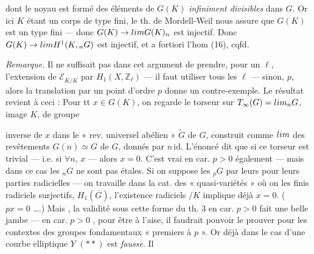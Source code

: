 \documentclass[11pt,a4paper]{article}
\begin{document}
dont le noyau  est formé des éléments de $G(K)$ \emph{infiniment divisibles} dans $G$. Or ici $K$ étant un  corps  de type fini, le th. de Mordell-Weil nous assure que $G(K)$ est un   type fini — donc $G(K) \to \varprojlim G(K)_n$ est injectif. Donc $G(K) \to \varprojlim H^1(K, {}_nG)$ est injectif, et a fortiori l'hom (16), cqfd.

\emph{Remarque.} Il ne suffisait pas dans cet argument de prendre, pour un $\ell$, l'extension de $\mathcal{E}_{\overline{K}/K}$ par $H_1(X, \mathbb{Z}_\ell)$ — il faut utiliser tous les $\ell$ — sinon, \ill{} $p$, alors la translation par un point d'ordre $p$ donne un contre-exemple. \struck{\ill{}} Le résultat revient à ceci : Pour tt $x \in G(K)$, on regarde le torseur sur $T_\infty(G) = \varprojlim {}_nG$, image  $K$, de groupe


inverse de $x$ dans le « rev. universel abélien » $\widetilde{G}$ de $G$, construit comme $\varprojlim$ des revêtements $G(n) \simeq G$ de $G$, donnés par $n\,\mathrm{id}$. L'énoncé dit que si ce torseur est trivial — i.e. si $\forall n$, $x$  — alors $x = 0$. C'est vrai en car. $p > 0$ également — mais dans ce cas les ${}_nG$ ne sont pas étales. Si on suppose \ill{}  les ${}_pG$ par leurs  \ill{} pour leurs parties radicielles — on travaille dans la cat. des « quasi-variétés » où on  les \struck{\ill{}}  finis radiciels surjectifs,   \ill{}  \ill{} $H_1(\overline{G})$,  l'existence  \ill{} radiciels $/K$ implique déjà $x = 0$. (\ill{}  \ill{} $px = 0$ ….) Mais , \ill{} la validité sous cette forme du th. 3 en car. $p > 0$  fait une belle jambe — en car. $p > 0$ \ill{}, pour être à l'aise, il faudrait pouvoir le prouver pour les contextes des groupes fondamentaux « premiers à $p$ ». Or déjà dans le cas d'une courbe elliptique $Y$  \ill{}  \struck{\ill{}}  $(**)$ est \emph{fausse}. Il

\end{document}

